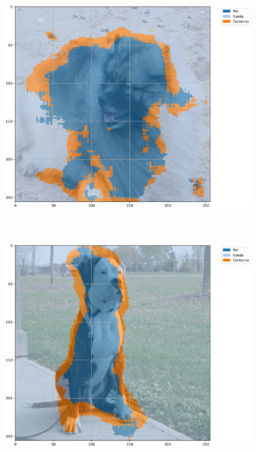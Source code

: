 \begin{figure}[H]
    \centering
    \caption{Exemplos segmentados a partir de U-Net-\textit{Like} com BPCAPooling e 500 épocas no conjunto de dados \textit{Oxford-IIIT Pets} baseada em acurácia.}
    \label{results:fig:semantic:12}
     \begin{subfigure}[t]{0.32\textwidth}
         \centering
         \includegraphics[width=1\linewidth]{recursos/imagens/results/bpca_acc_unetlike500_image_0_overlayed_segmentation.png}
         \label{results:fig:semantic:12.1}
     \end{subfigure}%
     ~ 
     \begin{subfigure}[t]{0.32\textwidth}
         \centering
         \includegraphics[width=1\linewidth]{recursos/imagens/results/bpca_acc_unetlike500_image_1_overlayed_segmentation.png}

\end{subfigure}
\end{figure}
